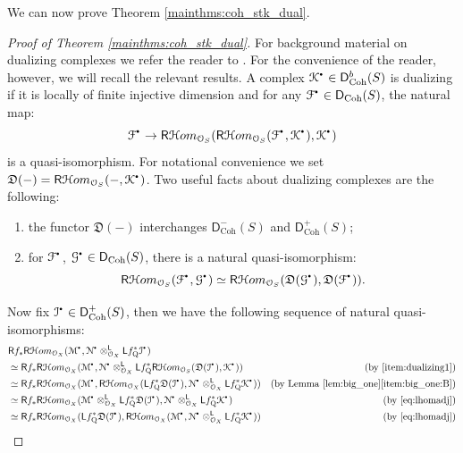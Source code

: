 \documentclass{amsart}
\theoremstyle{plain}
\theoremstyle{definition}
\theoremstyle{remark}
\numberwithin{equation}{section}
\newcommand{\itemref}[1]{\eqref{#1}}
\newcommand{\Orb}{\mathcal{O}}
\newcommand{\RDERF}{\mathsf{R}}
\newcommand{\LDERF}{\mathsf{L}}
\newcommand{\DCAT}{\mathsf{D}}
\newcommand{\SHom}{\mathcal{H}om}
\newcommand{\SRHom}{\RDERF\SHom}
\newcommand{\tensor}{\otimes}
\newcommand{\homotopic}{\simeq}
\newcommand{\shv}[1]{\mathcal{{#1}}}
\newcommand{\QCPSH}[1]{{#1}_{*}}
\newcommand{\QCPBK}[1]{{#1}_{\mathrm{Q}}^*}
\newcommand{\DCOH}{\DCAT_{\mathrm{Coh}}}
\newcommand{\sbt}{\,\begin{picture}(-1,-1)(0,-2)\circle*{1.5}\end{picture}\ }
\newcommand{\cplx}[1]{\shv{{#1}}^{\sbt}}
\newcommand{\DUAL}[1]{\mathfrak{D}({#1})}
\begin{document}
We can now prove Theorem \ref{mainthms:coh_stk_dual}.
\begin{proof}[Proof of Theorem \ref{mainthms:coh_stk_dual}]
  For background material on dualizing complexes we refer the reader
  to \cite[V.2]{MR0222093}. For the
  convenience of the reader, however, we will recall the relevant
  results. A complex $\cplx{K} \in \DCOH^b(S)$ is dualizing if it is
  locally of finite injective dimension and for any $\cplx{F} \in
  \DCOH(S)$, the natural map:
  \[
  \cplx{F} \to
  \SRHom_{\Orb_S}(\SRHom_{\Orb_S}(\cplx{F},\cplx{K}),\cplx{K})
  \]
  is a quasi-isomorphism. For notational convenience we set 
  $\DUAL{-}=\SRHom_{\Orb_S}(-,\cplx{K})$. Two useful facts about
  dualizing complexes are the following:
  \begin{enumerate}
  \item \label{item:dualizing1} the functor $\DUAL{-}$ interchanges
    $\DCOH^-(S)$ and $\DCOH^+(S)$;
  \item \label{item:dualizing2} for $\cplx{F}$, $\cplx{G} \in
    \DCOH(S)$, there is a natural quasi-isomorphism:
    \[
    \SRHom_{\Orb_S}(\cplx{F},\cplx{G}) \homotopic
    \SRHom_{\Orb_S}(\DUAL{\cplx{G}},\DUAL{\cplx{F}}).
    \]
  \end{enumerate}
  Now fix $\cplx{I} \in \DCOH^+(S)$, then we have the following
  sequence of natural quasi-isomorphisms:
  \begin{align*}
    &\RDERF \QCPSH{f} \SRHom_{\Orb_X}(\cplx{M},\cplx{N}
    \tensor_{\Orb_X}^\LDERF \LDERF \QCPBK{f}\cplx{I}) \\
    &\homotopic \RDERF \QCPSH{f}\SRHom_{\Orb_X}(\cplx{M},\cplx{N}
    \tensor_{\Orb_X}^{\LDERF} \LDERF
    \QCPBK{f}\SRHom_{\Orb_S}(\DUAL{\cplx{I}},\cplx{K})) & \mbox{(by \itemref{item:dualizing1})}\\
    &\homotopic \RDERF
    \QCPSH{f}\SRHom_{\Orb_X}(\cplx{M},\SRHom_{\Orb_X} (\LDERF
    \QCPBK{f}\DUAL{\cplx{I}}, \cplx{N}
    \tensor_{\Orb_X}^{\LDERF} \LDERF \QCPBK{f}\cplx{K})) & \mbox{(by Lemma
      \ref{lem:big_one}\itemref{item:big_one:B})}\\
    &\homotopic \RDERF
    \QCPSH{f}\SRHom_{\Orb_X}(\cplx{M}\tensor^{\LDERF}_{\Orb_X} \LDERF
    \QCPBK{f}\DUAL{\cplx{I}},\cplx{N}
    \tensor_{\Orb_X}^{\LDERF} \LDERF \QCPBK{f}\cplx{K}) &\mbox{(by
      \eqref{eq:lhomadj})}\\ 
   &\homotopic \RDERF \QCPSH{f}\SRHom_{\Orb_X}(\LDERF
    \QCPBK{f}\DUAL{\cplx{I}},\SRHom_{\Orb_X} ( \cplx{M}, \cplx{N}
    \tensor_{\Orb_X}^{\LDERF} \LDERF \QCPBK{f}\cplx{K})) &\mbox{(by
      \eqref{eq:lhomadj})}\\ 

\end{align*}
\end{proof}
\end{document}
